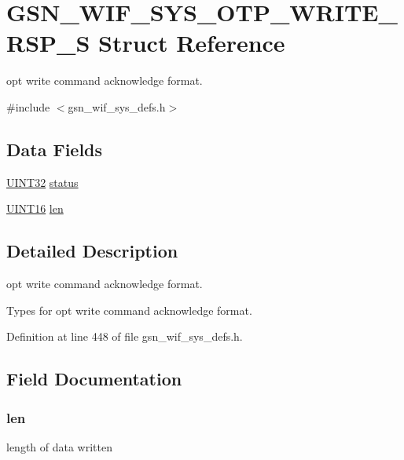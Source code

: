 \hypertarget{a00361}{
\section{GSN\_\-WIF\_\-SYS\_\-OTP\_\-WRITE\_\-RSP\_\-S Struct Reference}
\label{a00361}
}


opt write command acknowledge format.  




{\ttfamily \#include $<$gsn\_\-wif\_\-sys\_\-defs.h$>$}

\subsection*{Data Fields}
\begin{DoxyCompactItemize}
\item 
\hyperlink{a00660_gae1e6edbbc26d6fbc71a90190d0266018}{UINT32} \hyperlink{a00361_ac6b7193d1fe7063cf448ef96398230d8}{status}
\item 
\hyperlink{a00660_ga09f1a1fb2293e33483cc8d44aefb1eb1}{UINT16} \hyperlink{a00361_ab3bcead9c261261394a5d9b3bf8f95cb}{len}
\end{DoxyCompactItemize}


\subsection{Detailed Description}
opt write command acknowledge format. 

Types for opt write command acknowledge format. 

Definition at line 448 of file gsn\_\-wif\_\-sys\_\-defs.h.



\subsection{Field Documentation}
\hypertarget{a00361_ab3bcead9c261261394a5d9b3bf8f95cb}{
\subsubsection[{len}]{ {\bf len}}}
\label{a00361_ab3bcead9c261261394a5d9b3bf8f95cb}
length of data written 

